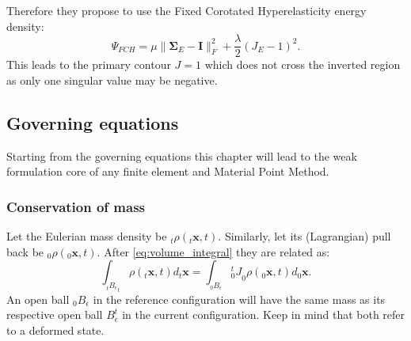 \documentclass[m,times]{cgMA}
\begin{document}
Therefore they propose to use the Fixed Corotated Hyperelasticity energy density:
\begin{equation}
  \Psi_{FCH} = \mu \|\boldsymbol{\Sigma}_E - \boldsymbol{I}\|^2_F + \frac{\lambda}{2}(J_E-1)^2.
\end{equation}
This leads to the primary contour $J=1$ which does not cross the inverted region as only one singular value may be negative.
\begin{flushright}\cite{MPM:INVERT}\end{flushright}
\subsection{Governing equations}
Starting from the governing equations this chapter will lead to the weak formulation core of any finite element and Material Point Method.
\subsubsection{Conservation of mass}
Let the Eulerian mass density be $_t\rho(_t\boldsymbol{x},t)$. Similarly, let its (Lagrangian) pull back be $_0\rho(_0\boldsymbol{x},t)$.
After \ref{eq:volume_integral} they are related as:
\begin{equation} \label{eq:density_pull_back}
  \int _ {_tB _ { \epsilon }}_t\rho(_t\boldsymbol{x},t)d_t\boldsymbol{x} =   \int _ {_0B _ { \epsilon }} {^t_0J}_0\rho(_0\boldsymbol{x},t) d_0\boldsymbol{x}.
\end{equation}
An open ball $ _ { 0 }B _ { \epsilon } $ in the reference configuration will have the same mass as its respective open ball $B_{\epsilon}^t$ in the current configuration. Keep in mind that both refer to a deformed state.
\end{document}
